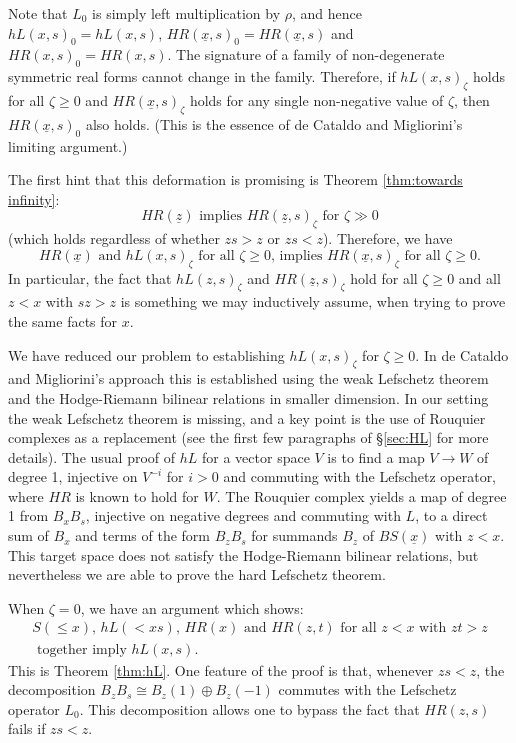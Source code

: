 \documentclass[11pt]{amsart}
\numberwithin{equation}{section}
\def\z{\zeta}
\def\un{\underline}
\def\to{\rightarrow}
\theoremstyle{definition}
\theoremstyle{remark}
\begin{document}
Note that $L_0$ is simply left multiplication by $\rho$, and hence
$hL(x,s)_0 = hL(x,s)$, $HR(\un{x},s)_0 = HR(\un{x},s)$ and $HR(x,s)_0
= HR(x,s)$. The signature of a family of non-degenerate symmetric real
forms cannot change in the family. Therefore, if $hL(x,s)_\z$ holds for all $\z \ge 0$ and $HR(\un{x},s)_\z$ holds for any single non-negative value of $\z$, then $HR(\un{x},s)_0$ also holds. (This is the essence
of de Cataldo and Migliorini's limiting argument.)

The first hint that this deformation is promising is Theorem \ref{thm:towards infinity}:
\begin{equation}
  \label{eq:limit}
  \text{$HR(\un{z})$ implies $HR(\un{z}, s)_\z$ for $\z \gg 0$}
\end{equation}
(which holds regardless of whether $zs > z$ or $zs < z$). Therefore, we have
\begin{equation}
  \label{eq:hLzs>s}
  \text{$HR(\un{x})$ and $hL(x,s)_\z$ for all $\z \ge 0$, implies $HR(\un{x},
    s)_\z$ for all $\z \ge 0$.}
\end{equation}
In particular, the fact that $hL(z,s)_\z$ and $HR(\un{z},s)_\z$ hold for all $\z \ge 0$ and all $z<x$ with $sz > z$ is something we may inductively assume, when trying to prove the same facts for $x$.

We have reduced our problem to establishing $hL(x,s)_\z$ for $\z \ge 0$. In de Cataldo and Migliorini's approach this is established using the weak
Lefschetz theorem and the Hodge-Riemann bilinear relations in smaller dimension. In our setting the weak Lefschetz theorem is missing, and a key
point is the use of Rouquier complexes as a replacement (see the first few paragraphs of \S\ref{sec:HL} for more details). The usual proof of $hL$
for a vector space $V$ is to find a map $V \to W$ of degree 1, injective on $V^{-i}$ for $i>0$ and commuting with the Lefschetz operator, where $HR$
is known to hold for $W$. The Rouquier complex yields a map of degree 1 from $B_x B_s$, injective on negative degrees and commuting with $L$, to a
direct sum of $B_x$ and terms of the form $B_z B_s$ for summands $B_z$
of $BS(\un{x})$ with $z < x$. This target space does not satisfy the
Hodge-Riemann bilinear relations, but
nevertheless we are able to prove the hard Lefschetz theorem.

When $\z=0$, we have an argument which shows:
\begin{equation}\label{eq:hLz=0} \begin{array}{c} \text{$S(\le\!x)$,
      $hL(<\!xs)$, $HR(x)$ and $HR(z,t)$ for all $z < x$ with $zt > z$}\\
\text{ together imply $hL(x,s)$.} \end{array} \end{equation}
This is Theorem \ref{thm:hL}. One feature of the proof is that, whenever $zs < z$, the decomposition $B_z B_s \cong B_z(1) \oplus B_z(-1)$
commutes with the Lefschetz operator $L_0$. This decomposition allows one to bypass the fact that $HR(z,s)$ fails if $zs < z$.
\end{document}
